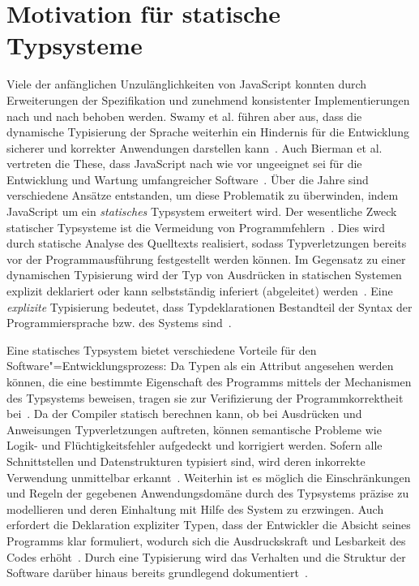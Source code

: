 \section{Motivation für statische Typsysteme}

Viele der anfänglichen Unzulänglichkeiten von JavaScript konnten durch Erweiterungen der Spezifikation und zunehmend konsistenter Implementierungen nach und nach behoben werden. Swamy et al. führen aber aus, dass die dynamische Typisierung der Sprache weiterhin ein Hindernis für die Entwicklung sicherer und korrekter Anwendungen darstellen kann~\autocite{NIKHIL:2014}. Auch Bierman et al. vertreten die These, dass JavaScript nach wie vor ungeeignet sei für die Entwicklung und Wartung umfangreicher Software~\autocite[1]{BIERMAN:2014}. Über die Jahre sind verschiedene Ansätze entstanden, um diese Problematik zu überwinden, indem JavaScript um ein \emph{statisches} Typsystem erweitert wird. Der wesentliche Zweck statischer Typsysteme ist die Vermeidung von Programmfehlern~\autocite[1]{CARDELLI:TYPE_SYSTEMS}. Dies wird durch statische Analyse des Quelltexts realisiert, sodass Typverletzungen bereits vor der Programmausführung festgestellt werden können. Im Gegensatz zu einer dynamischen Typisierung wird der Typ von Ausdrücken in statischen Systemen explizit deklariert oder kann selbstständig inferiert (abgeleitet) werden~\autocite[45]{WALDMANN:PPS}. Eine \emph{explizite} Typisierung bedeutet, dass Typdeklarationen Bestandteil der Syntax der Programmiersprache bzw. des Systems sind~\autocite[2]{CARDELLI:TYPE_SYSTEMS}.

Eine statisches Typsystem bietet verschiedene Vorteile für den Software"=Entwicklungsprozess: Da Typen als ein Attribut angesehen werden können, die eine bestimmte Eigenschaft des Programms mittels der Mechanismen des Typsystems beweisen, tragen sie zur Verifizierung der Programmkorrektheit bei~\autocite{SMITH:TYPE_SYSTEMS}. Da der Compiler statisch berechnen kann, ob bei Ausdrücken und Anweisungen Typverletzungen auftreten, können semantische Probleme wie Logik- und Flüchtigkeitsfehler aufgedeckt und korrigiert werden. Sofern alle Schnittstellen und Datenstrukturen typisiert sind, wird deren inkorrekte Verwendung unmittelbar erkannt~\autocite[6]{CARDELLI:TYPE_SYSTEMS}. Weiterhin ist es möglich die Einschränkungen und Regeln der gegebenen Anwendungsdomäne durch des Typsystems präzise zu modellieren und deren Einhaltung mit Hilfe des System zu erzwingen. Auch erfordert die Deklaration expliziter Typen, dass der Entwickler die Absicht seines Programms klar formuliert, wodurch sich die Ausdruckskraft und Lesbarkeit des Codes erhöht~\autocite[96]{WALDMANN:PPS}. Durch eine Typisierung wird das Verhalten und die Struktur der Software darüber hinaus bereits grundlegend dokumentiert~\autocite[Abschn. 6.1.1]{MITCHELL:CONCEPTS}.

